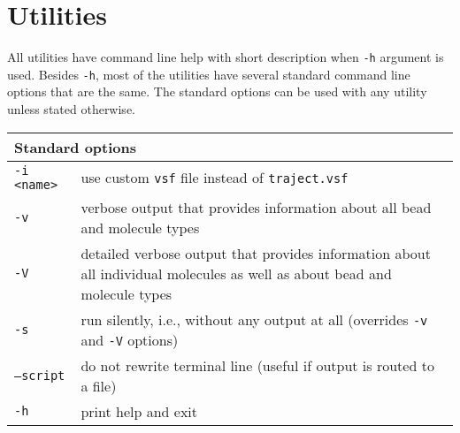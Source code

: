 \chapter{Utilities} \label{chap:Utils}

All utilities have command line help with short description when
\texttt{-h} argument is used. Besides \texttt{-h}, most of the utilities
have several standard command line options that are the same. The standard
options can be used with any utility unless stated otherwise.

\vspace{1em}
\noindent
\begin{tabular}{p{}p{}}
  \toprule
  \multicolumn{2}{l}{Standard options} \\
  \midrule
  \texttt{-i <name>} & use custom \texttt{vsf} file instead of
    \texttt{traject.vsf} \\
  \texttt{-v}        & verbose output that provides information about all
    bead and molecule types \\
  \texttt{-V}        & detailed verbose output that provides
    information about all individual molecules as well as about bead and
    molecule types \\
  \texttt{-s}        & run silently, i.e., without any output at all
    (overrides \texttt{-v} and \texttt{-V} options) \\
  \texttt{--script}  & do not rewrite terminal line (useful if output is
    routed to a file) \\
  \texttt{-h}        & print help and exit \\
  \bottomrule
\end{tabular}












%











